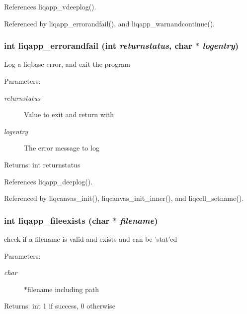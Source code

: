 References liqapp\_\-vdeeplog().

Referenced by liqapp\_\-errorandfail(), and liqapp\_\-warnandcontinue().
\subsubsection[{liqapp\_\-errorandfail}]{\setlength{\rightskip}{0pt plus 5cm}int liqapp\_\-errorandfail (int {\em returnstatus}, \/  char $\ast$ {\em logentry})}\label{d7/dbc/liqapp_8c_25a23265fd44166a8b96e02dc9cb5b8b}


Log a liqbase error, and exit the program \begin{Desc}
\item[Parameters:]
\begin{description}
\item[{\em returnstatus}]Value to exit and return with \item[{\em logentry}]The error message to log \end{description}
\end{Desc}
\begin{Desc}
\item[Returns:]int returnstatus \end{Desc}


References liqapp\_\-deeplog().

Referenced by liqcanvas\_\-init(), liqcanvas\_\-init\_\-inner(), and liqcell\_\-setname().
\subsubsection[{liqapp\_\-fileexists}]{\setlength{\rightskip}{0pt plus 5cm}int liqapp\_\-fileexists (char $\ast$ {\em filename})}\label{d7/dbc/liqapp_8c_d1ca93ee33a6273d83c64cde81dcd145}


check if a filename is valid and exists and can be 'stat'ed \begin{Desc}
\item[Parameters:]
\begin{description}
\item[{\em char}]$\ast$filename including path \end{description}
\end{Desc}
\begin{Desc}
\item[Returns:]int 1 if success, 0 otherwise \end{Desc}


